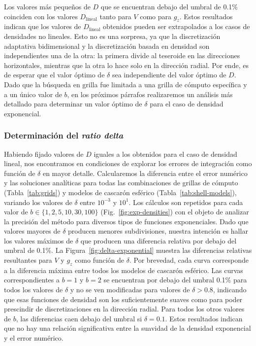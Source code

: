 Los valores más pequeños de $D$ que se encuentran debajo del umbral de 0.1\%
coinciden con los valores $D_\text{lineal}$ tanto para $V$ como para $g_z$.
Estos resultados indican que los valores de $D_\text{lineal}$ obtenidos pueden
ser extrapolados a los casos de densidades no lineales.
Esto no es una sorpresa, ya que la discretización adaptativa bidimensional y la
discretización basada en densidad son independientes una de la otra: la primera
divide al teseroide en las direcciones horizontales, mientras que la otra lo
hace solo en la dirección radial.
Por ende, es de esperar que el valor óptimo de $\delta$ sea independiente del
valor óptimo de $D$.
Dado que la búsqueda en grilla fue limitada a una grilla de cómputo específica
y a un único valor de $b$, en los próximos párrafos realizaremos un análisis
más detallado para determinar un valor óptimo de $\delta$ para el caso de
densidad exponencial.


\subsubsection{Determinación del \emph{ratio delta}}

Habiendo fijado valores de $D$ iguales a los obtenidos para el caso de
densidad lineal, nos encontramos en condiciones de explorar los errores de
integración como función de $\delta$ en mayor detalle.
Calcularemos la diferencia entre el error numérico y las soluciones analíticas
para todas las combinaciones de grillas de cómputo (Tabla~\ref{tab:grids})
y modelos de cascarón esférico (Tabla~\ref{tab:shell-models}),
variando los valores de $\delta$ entre $10^{-3}$ y $10^{1}$.
Los cálculos son repetidos para cada valor de $b \in \{1, 2, 5, 10, 30, 100\}$
(Fig.~\ref{fig:exp-densities}) con el objeto de analizar la precisión del
método para diversos tipos de funciones exponenciales.
Dado que valores mayores de $\delta$ producen menores subdivisiones, nuestra
intención es hallar los valores máximos de $\delta$ que producen una diferencia
relativa por debajo del umbral de 0.1\%.
La Figura~\ref{fig:delta-exponential} muestra las diferencias relativas
resultantes para $V$ y $g_z$ como función de $\delta$.
Por brevedad, cada curva corresponde a la diferencia máxima entre todos los
modelos de cascarón esférico.
Las curvas correspondientes a $b=1$ y $b=2$ se encuentran por debajo del umbral
0.1\% para todos los valores de $\delta$ y no se ven modificadas para valores
de $\delta > 0.8$, indicando que esas funciones de densidad son los
suficientemente suaves como para poder prescindir de discretizaciones en la
dirección radial.
Para todos los otros valores de $b$, las diferencias caen debajo del umbral si
$\delta=0.1$.
Estos resultados indican que no hay una relación significativa entre la
suavidad de la densidad exponencial y el error numérico.

